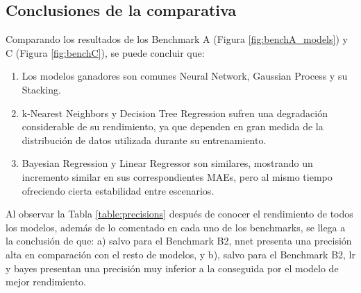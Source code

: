 \subsection{Conclusiones de la comparativa}

Comparando los resultados de los Benchmark A (Figura \ref{fig:benchA_models}) y C (Figura \ref{fig:benchC}), se puede concluir que: %
\begin{enumerate}
\item Los modelos ganadores son comunes Neural Network, Gaussian Process y su Stacking.
\item k-Nearest Neighbors y Decision Tree Regression sufren una degradación considerable de su rendimiento, ya que dependen en gran medida de la distribución de datos utilizada durante su entrenamiento.
\item Bayesian Regression y Linear Regressor son similares, mostrando un incremento similar en sus correspondientes MAEs, pero al mismo tiempo ofreciendo cierta estabilidad entre escenarios.
\end{enumerate}


Al observar la Tabla \ref{table:precisions} después de conocer el rendimiento de todos los modelos, además de lo comentado en cada uno de los benchmarks, se llega a la conclusión de que: a) salvo para el Benchmark B2, nnet presenta una precisión alta en comparación con el resto de modelos, y b), salvo para el Benchmark B2, lr y bayes presentan una precisión muy inferior a la conseguida por el modelo de mejor rendimiento.

\begin{table}[H]
\centering
{}%
\caption{Precisión de todos los métodos en los diferentes benchmarks. La precisión se mide como el porcentaje de estimaciones de edad que caen dentro del margen de confianza asociado a cada estrella.}\label{table:precisions}
\end{table}


